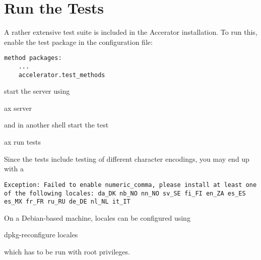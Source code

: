 \section{Run the Tests}
A rather extensive test suite is included in the Accerator
installation.  To run this, enable the test package in the
configuration file:
\begin{verbatim}
method packages:
    ...
    accelerator.test_methods
\end{verbatim}
start the server using
\begin{python}
ax server
\end{python}
and in another shell start the test
\begin{python}
ax run tests
\end{python}
Since the tests include testing of different character encodings, you may end up with a
\begin{verbatim}
Exception: Failed to enable numeric_comma, please install at least one
of the following locales: da_DK nb_NO nn_NO sv_SE fi_FI en_ZA es_ES
es_MX fr_FR ru_RU de_DE nl_NL it_IT
\end{verbatim}
On a Debian-based machine, locales can be configured using
\begin{shell}
dpkg-reconfigure locales 
\end{shell}
which has to be run with root privileges.




